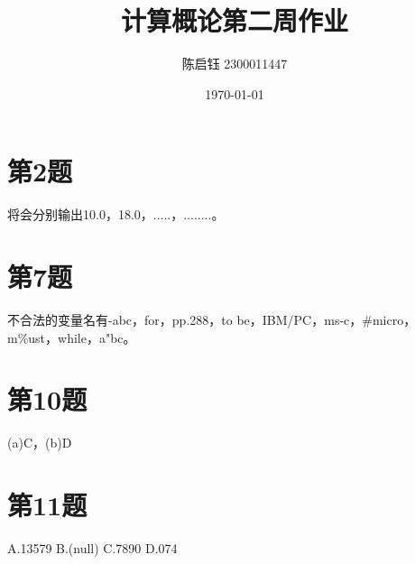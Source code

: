 \documentclass{ctexart}
\title{计算概论第二周作业}
\author{陈启钰\,\,2300011447}
\date{\today}
\begin{document}
	\maketitle
	\section{第2题}
	将会分别输出10.0，18.0，.....，........。
	\section{第7题}
	不合法的变量名有-abc，for，pp.288，to be，IBM/PC，ms-c，\#micro，m\%ust，while，a"bc。
	\section{第10题}
	(a)C，(b)D
	\section{第11题}
	A.13579
	B.(null)
	C.7890
	D.074
\end{document}

